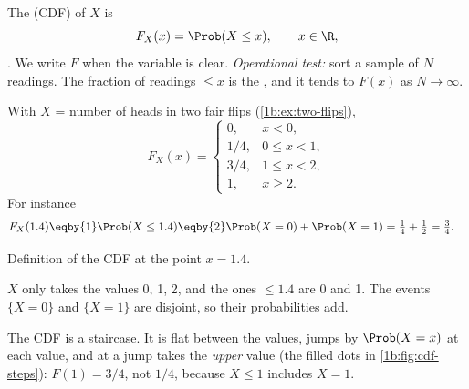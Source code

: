\begin{workdef}
The  (CDF) of $X$ is
\[
  F_X(x)=\Prob(X\le x),\qquad x\in\R ,
\]
. We write $F$ when the variable is
clear.
\emph{Operational test:} sort a sample of $N$ readings. The fraction of
readings $\le x$ is the , and it tends to $F(x)$ as
$N\to\infty$.
\end{workdef}

\label{1b:ex:cdf-two-flips}
With $X$ = number of heads in two fair flips (\cref{1b:ex:two-flips}),
\[
  F_X(x)=\begin{cases}
  0, & x<0,\\ 1/4, & 0\le x<1,\\ 3/4, & 1\le x<2,\\ 1, & x\ge2 .
  \end{cases}
\]
For instance
\begin{align*}
  F_X(1.4)
  &\eqby{1} \Prob(X\le1.4)
   \eqby{2} \Prob(X=0)+\Prob(X=1)
   = \tfrac14+\tfrac12=\tfrac34 .
\end{align*}
\begin{explain}
  \item Definition of the CDF at the point $x=1.4$.
  \item $X$ only takes the values 0, 1, 2, and the ones $\le1.4$ are 0 and 1.
        The events $\{X=0\}$ and $\{X=1\}$ are disjoint, so their
        probabilities add.
\end{explain}
The CDF is a staircase. It is flat between the values, jumps by
$\Prob(X=x)$ at each value, and at a jump takes the \emph{upper} value (the
filled dots in \cref{1b:fig:cdf-steps}): $F(1)=3/4$, not $1/4$, because
$X\le1$ includes $X=1$.

